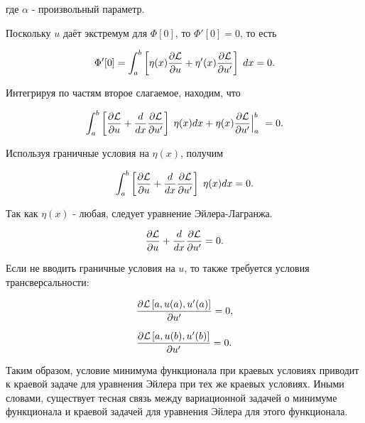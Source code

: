 \documentclass{article}
\begin{document}
\noindent где $\alpha$ - произвольный параметр.

Поскольку $u$ даёт экстремум для $\Phi[0]$, то $\Phi'[0] = 0$, то есть

\begin{displaymath}
	\Phi'[0] = \int_{a}^{b} \left[ \eta(x) \frac{\partial \mathcal{L}}{\partial u} + \eta ' (x) \frac{\partial \mathcal{L}}{\partial u'} \right]  \; dx = 0.
\end{displaymath}

\noindent Интегрируя по частям второе слагаемое, находим, что 

\begin{displaymath}
	\int_{a}^{b} \left[\frac{\partial \mathcal{L}}{\partial u} + \frac{d}{dx} \frac{\partial \mathcal{L}}{\partial u'} \right]  \; \eta(x) dx + \eta(x) \frac{\partial \mathcal{L}}{\partial u'} \Big|_a^b \ = 0.
\end{displaymath}

\noindent Используя граничные условия на $\eta(x)$, получим

\begin{displaymath}
	\int_{a}^{b} \left[\frac{\partial \mathcal{L}}{\partial u} + \frac{d}{dx} \frac{\partial \mathcal{L}}{\partial u'} \right]  \; \eta(x) dx = 0.
\end{displaymath}

\noindent Так как $\eta(x)$ - любая, следует уравнение Эйлера-Лагранжа.

\begin{equation}\label{euler_equation}
	\frac{\partial \mathcal{L}}{\partial u} + \frac{d}{dx} \frac{\partial \mathcal{L}}{\partial u'} = 0.
\end{equation}

\noindent Если не вводить граничные условия на $u$, то также требуется условия трансверсальности:

\begin{displaymath}
	\frac{\partial \mathcal{L} \left[a, u(a), u'(a) \right] }{\partial u'} = 0,
\end{displaymath}

\begin{displaymath}
	\frac{\partial \mathcal{L} \left[a, u(b), u'(b) \right] }{\partial u'} = 0.
\end{displaymath}


Таким образом, условие минимума функционала при краевых условиях приводит к краевой задаче для уравнения Эйлера при тех же краевых условиях. Иными словами, существует тесная связь между вариационной задачей о минимуме функционала и краевой задачей для уравнения Эйлера для этого функционала.
\end{document}
